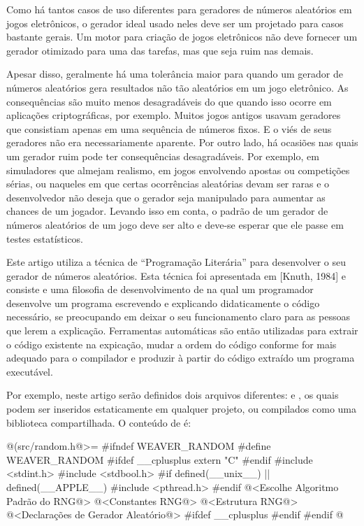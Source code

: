 Como há tantos casos de uso diferentes para geradores de números
aleatórios em jogos eletrônicos, o gerador ideal usado neles deve ser
um projetado para casos bastante gerais. Um motor para criação de
jogos eletrônicos não deve fornecer um gerador otimizado para uma das
tarefas, mas que seja ruim nas demais.

Apesar disso, geralmente há uma tolerância maior para quando um
gerador de números aleatórios gera resultados não tão aleatórios em um
jogo eletrônico. As consequências são muito menos desagradáveis do que
quando isso ocorre em aplicações criptográficas, por exemplo. Muitos
jogos antigos usavam geradores que consistiam apenas em uma sequência
de números fixos. E o viés de seus geradores não era necessariamente
aparente. Por outro lado, há ocasiões nas quais um gerador ruim pode
ter consequências desagradáveis. Por exemplo, em simuladores que
almejam realismo, em jogos envolvendo apostas ou competições sérias,
ou naqueles em que certas ocorrências aleatórias devam ser raras e o
desenvolvedor não deseja que o gerador seja manipulado para aumentar
as chances de um jogador. Levando isso em conta, o padrão de um
gerador de números aleatórios de um jogo deve ser alto e deve-se
esperar que ele passe em testes estatísticos.


Este artigo utiliza a técnica de ``Programação Literária'' para
desenvolver o seu gerador de números aleatórios. Esta técnica foi apresentada
em [Knuth, 1984] e consiste e uma filosofia de desenvolvimento de
 na qual um programador desenvolve um programa escrevendo
e explicando didaticamente o código necessário, se preocupando em
deixar o seu funcionamento claro para as pessoas que lerem a
explicação. Ferramentas automáticas são então utilizadas para extrair
o código existente na expicação, mudar a ordem do código conforme for
mais adequado para o compilador e produzir à partir do código extraído
um programa executável.

Por exemplo, neste artigo serão definidos dois arquivos
diferentes:  e , os quais
podem ser inseridos estaticamente em qualquer projeto, ou compilados
como uma biblioteca compartilhada. O conteúdo de 
é:

\iniciocodigo
@(src/random.h@>=
#ifndef WEAVER_RANDOM
#define WEAVER_RANDOM
#ifdef __cplusplus
extern "C" {
#endif
#include <stdint.h>
#include <stdbool.h>
#if defined(__unix__) || defined(__APPLE__)
#include <pthread.h>
#endif
@<Escolhe Algoritmo Padrão do RNG@>
@<Constantes RNG@>
@<Estrutura RNG@>
@<Declarações de Gerador Aleatório@>
#ifdef __cplusplus
}
#endif
#endif
@
\fimcodigo

